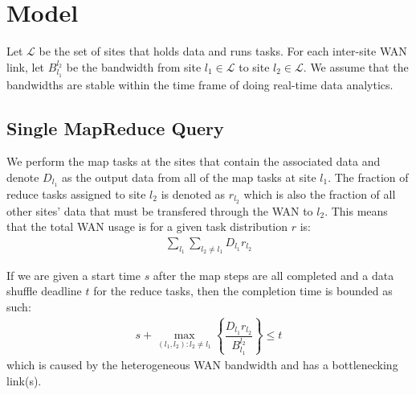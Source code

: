 \section{Model}
\label{sec:model}

Let $\mathcal{L}$ be the set of sites that holds data and runs tasks.
For each inter-site WAN link, let $B_{l_1}^{l_2}$ be the bandwidth from site $l_1\in\mathcal{L}$ to site $l_2\in\mathcal{L}$.
We assume that the bandwidths are stable within the time frame of doing real-time data analytics.

\subsection{Single MapReduce Query}
We perform the map tasks at the sites that contain the associated data and denote $D_{l_1}$ as the output data from all of the map tasks at site $l_1$.
The fraction of reduce tasks assigned to site $l_2$ is denoted as $r_{l_2}$ which is also the fraction of all other sites' data that must be transfered through the WAN to $l_2$.
This means that the total WAN usage is for a given task distribution $r$ is:
\begin{align}
	\sum_{l_1}\sum_{l_2\neq l_1}D_{l_1}r_{l_2}
\end{align}

If we are given a start time $s$ after the map steps are all completed and a data shuffle deadline $t$ for the reduce tasks, then the completion time is bounded as such:
\begin{align}
	s + \max_{(l_1,l_2):l_2\neq l_1} \left\{\dfrac{D_{l_1}r_{l_2}}{B_{l_1}^{l_2}}\right\} \leq t
\end{align}
which is caused by the heterogeneous WAN bandwidth and has a bottlenecking link(s).